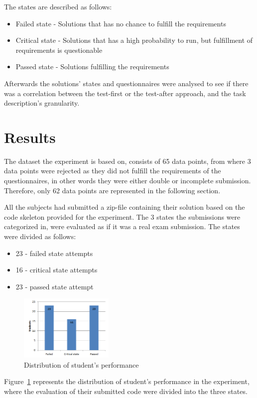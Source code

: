\documentclass{sig-alternate-05-2015}
\begin{document}
The states are described as follows:
\begin{itemize}
	\item Failed state - Solutions that has no chance to fulfill the requirements
	\item Critical state - Solutions that has a high probability to run, but fulfillment of requirements is questionable
	\item Passed state - Solutions fulfilling the requirements
\end{itemize}

Afterwards the solutions' states and questionnaires were analysed to see if there was a correlation between the test-first or the test-after approach, and the task description's granularity.

\section{Results}
The dataset the experiment is based on, consists of 65 data points, from where 3 data points were rejected as they did not fulfill the requirements of the questionnaires, in other words they were either double or incomplete submission. Therefore, only 62 data points are represented in the following section.

All the subjects had submitted a zip-file containing their solution based on the code skeleton provided for the experiment. The 3 states the submissions were categorized in, were evaluated as if it was a real exam submission.
The states were divided as follows:

\begin{itemize}
	\item 23 - failed state attempts
	\item 16 - critical state attempts
	\item 23 - passed state attempt
\end{itemize}

\begin{figure}[H]
	\centering
	\includegraphics[width=0.4\textwidth]{img01}
	\caption{Distribution of student's performance}
	\label{fig:Distribution of student's performancel}
\end{figure}
Figure~\ref{fig:Distribution of student's performancel} represents the distribution of student's performance in the experiment, where the evaluation of their submitted code were divided into the three states.\\
\end{document}

